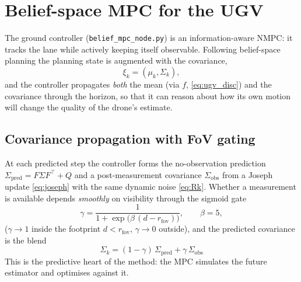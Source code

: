 \documentclass[11pt]{article}
\newcommand{\code}[1]{\texttt{#1}}
\newcommand{\fov}{\mathrm{fov}}
\begin{document}
\section{Belief-space MPC for the UGV}
\label{sec:beliefmpc}

The ground controller (\code{belief\_mpc\_node.py}) is an information-aware NMPC: it tracks the lane while
actively keeping itself observable. Following belief-space planning \citep{platt2010belief,vandenberg2012motion}
the planning state is augmented with the covariance,
\begin{equation}
\xi_k = (\mu_k,\Sigma_k),
\end{equation}
and the controller propagates \emph{both} the mean (via $f$, \cref{eq:ugv_disc}) and the covariance through
the horizon, so that it can reason about how its own motion will change the quality of the drone's estimate.

\subsection{Covariance propagation with FoV gating}
At each predicted step the controller forms the no-observation prediction $\Sigma_{\text{pred}}=F\Sigma F^\top
+Q$ and a post-measurement covariance $\Sigma_{\text{obs}}$ from a Joseph update \cref{eq:joseph} with the same
dynamic noise \cref{eq:Rk}. Whether a measurement is available depends \emph{smoothly} on visibility through
the sigmoid gate
\begin{equation}
\gamma = \frac{1}{1+\exp\!\big(\beta\,(d-r_{\fov})\big)},\qquad \beta=5,
\label{eq:gate}
\end{equation}
($\gamma\to1$ inside the footprint $d<r_{\fov}$, $\gamma\to0$ outside), and the predicted covariance is the
blend
\begin{equation}
\boxed{\;\Sigma_k = (1-\gamma)\,\Sigma_{\text{pred}} + \gamma\,\Sigma_{\text{obs}}\;}
\label{eq:blend}
\end{equation}
This is the predictive heart of the method: the MPC simulates the future estimator and optimises against it.
\end{document}
